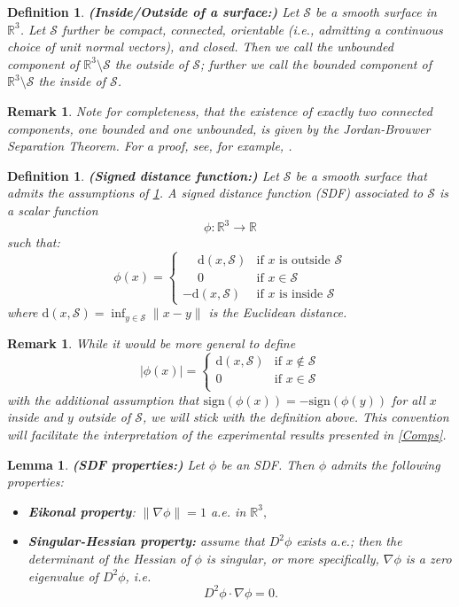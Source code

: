 \documentclass[12pt,openany]{book}
\newcommand{\R}{\mathbb{R}}
\def\S{\mathcal{S}}
\theoremstyle{plainnormal}
\newtheorem{lemma}[theorem]{Lemma}
\newtheorem{definition}[theorem]{Definition}
\newtheorem{remark}[theorem]{Remark}
\theoremstyle{remark}
\begin{document}
\begin{definition}\label{defInsOuts}\textbf{(Inside/Outside of a surface:)}
    Let $\S$ be a smooth surface in $\R^3$. Let $\S$ further be compact, connected, orientable (i.e., admitting a continuous choice of unit normal vectors), and closed. Then we call the unbounded component of $\R^3\setminus \S$ the \emph{outside} of $\S$; further we call the bounded component of $\R^3\setminus \S$ the \emph{inside} of $\S$.
\end{definition}
\begin{remark}
    Note for completeness, that the existence of exactly two connected components, one bounded and one unbounded, is given by the \emph{Jordan-Brouwer Separation Theorem}. For a proof, see, for example, \cite{Lima01011988}. 
\end{remark}
\begin{definition}\textbf{(Signed distance function:)}
    Let $\S$ be a smooth surface that admits the assumptions of \cref{defInsOuts}. A \emph{signed distance function} (SDF) associated to $\S$ is a scalar function 
    $$\phi: \R^3 \rightarrow \R$$
    such that:
    $$\phi(x) = 
\begin{cases}
\phantom{-}\mathrm{d}(x, \S) & \text{if } x \text{ is outside } \S \\
\phantom{-} 0 & \text{if } x \in \S \\
-\mathrm{d}(x, \S) & \text{if } x \text{ is inside } \S
\end{cases} $$
    where $\mathrm{d} (x, \S)= \inf_{y\in \S} \|x - y\|$ is the Euclidean distance.
\end{definition}
    \begin{remark}
        While it would be more general to define
    $$|\phi(x)| = 
\begin{cases}
\mathrm{d}(x, \S) & \text{if } x \notin \S \\
0 & \text{if } x \in \S \\
\end{cases}$$
with the additional assumption that 
$\mathrm{sign}(\phi(x)) = - \mathrm{sign}(\phi (y))$ for all $x$ inside and $y$ outside of $\S$, we will stick with the definition above. This convention will facilitate the interpretation of the experimental results presented in \cref{Comps}.
    \end{remark}
\begin{lemma}\label{singHess} \textbf{(SDF properties:)}
    Let $\phi$ be an SDF. Then $\phi$ admits the following properties:
    \begin{itemize}
        \item \textbf{Eikonal property}:  $\|\nabla \phi\| = 1 $ a.e. in $\R^3,$ 
        \item \textbf{Singular-Hessian property:} assume that $D^2\phi$ exists a.e.; then the determinant of the Hessian of $\phi$ is singular, or more specifically, $\nabla \phi$ is a zero eigenvalue of $D^2 \phi$, i.e.
        $$D^2 \phi \cdot\nabla \phi = 0.$$
    
    \end{itemize}
\end{lemma}
\end{document}
